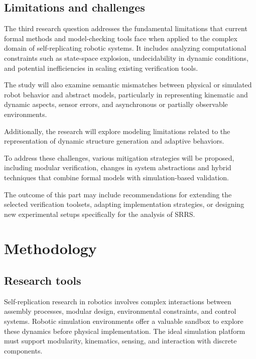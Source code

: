 \section{Limitations and challenges}


The third research question addresses the fundamental limitations that 
current formal methods and model-checking tools face when applied to the 
complex domain of self-replicating robotic systems.
It includes analyzing computational constraints such as state-space explosion, 
undecidability in dynamic conditions, and potential inefficiencies in scaling existing verification tools. 

The study will also examine semantic mismatches between physical 
or simulated robot behavior and abstract models, particularly in representing kinematic 
and dynamic aspects, sensor errors, and asynchronous or partially 
observable environments. 

Additionally, the research will explore modeling limitations related 
to the representation of dynamic structure generation and adaptive behaviors.

To address these challenges, various mitigation strategies will be proposed,
including modular verification, changes in system abstractions  
and hybrid techniques that combine formal models with simulation-based validation. 

The outcome of this part may include recommendations for extending the 
selected verification toolsets, adapting implementation strategies, or designing 
new experimental setups specifically for the analysis of SRRS.



\chapter{Methodology}




\section{Research tools}


Self-replication research in robotics involves complex interactions between 
assembly processes, modular design, environmental constraints, 
and control systems. 
Robotic simulation environments offer a valuable sandbox to 
explore these dynamics before physical implementation. 
The ideal simulation platform must support modularity, kinematics, 
sensing, and interaction with discrete components.

